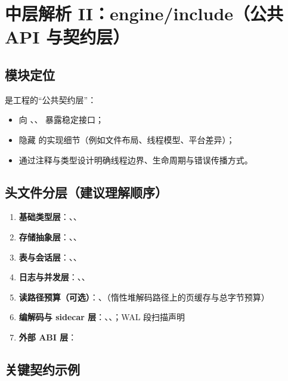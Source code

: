 \section{中层解析 II：engine/include（公共 API 与契约层）}

\subsection{模块定位}

 是工程的“公共契约层”：

\begin{itemize}
  \item 向 、、 暴露稳定接口；
  \item 隐藏  的实现细节（例如文件布局、线程模型、平台差异）；
  \item 通过注释与类型设计明确线程边界、生命周期与错误传播方式。
\end{itemize}

\subsection{头文件分层（建议理解顺序）}

\begin{enumerate}
  \item \textbf{基础类型层}：、、
  \item \textbf{存储抽象层}：、、
  \item \textbf{表与会话层}：、、
  \item \textbf{日志与并发层}：、、
  \item \textbf{读路径预算（可选）}：、（惰性堆解码路径上的页缓存与总字节预算）
  \item \textbf{编解码与 sidecar 层}：、、；WAL 段扫描声明 
  \item \textbf{外部 ABI 层}：
\end{enumerate}

\subsection{关键契约示例}

